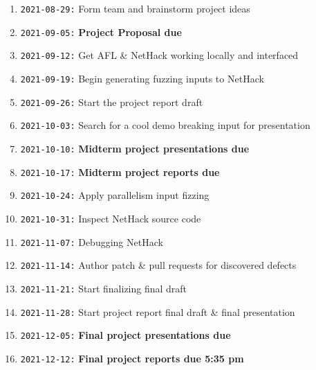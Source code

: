 \documentclass[12pt]{diazessay}
\begin{document}
  \begin{enumerate}[label={}]
  	\item \texttt{2021-08-29:} Form team and brainstorm project ideas
  	\item \texttt{2021-09-05:} \textbf{Project Proposal due}
  	\item \texttt{2021-09-12:} Get AFL \& NetHack working locally and interfaced
 	\item \texttt{2021-09-19:} Begin generating fuzzing inputs to NetHack
  	\item \texttt{2021-09-26:} Start the project report draft
  	\item \texttt{2021-10-03:} Search for a cool demo breaking input for presentation
  	\item \texttt{2021-10-10:} \textbf{Midterm project presentations due}
  	\item \texttt{2021-10-17:} \textbf{Midterm project reports due}
  	\item \texttt{2021-10-24:} Apply parallelism input fizzing
  	\item \texttt{2021-10-31:} Inspect NetHack source code
  	\item \texttt{2021-11-07:} Debugging NetHack
  	\item \texttt{2021-11-14:} Author patch \& pull requests for discovered defects
  	\item \texttt{2021-11-21:} Start finalizing final draft
  	\item \texttt{2021-11-28:} Start project report final draft \& final presentation
  	\item \texttt{2021-12-05:} \textbf{Final project presentations due}
  	\item \texttt{2021-12-12:} \textbf{Final project reports due 5:35 pm}
  \end{enumerate}
\end{document}
